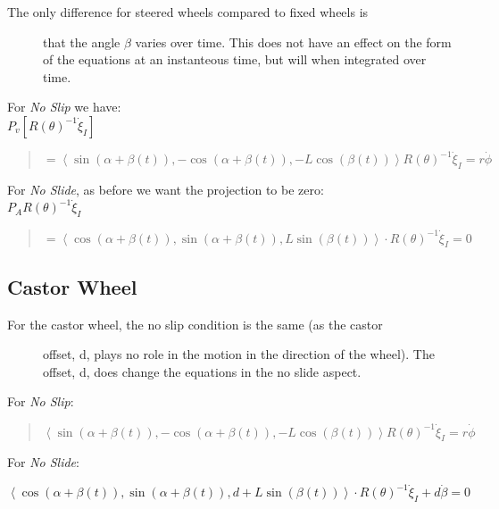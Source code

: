 \begin{description}
\item[The only difference for steered wheels compared to fixed wheels
is]
that the angle \(\beta\) varies over time. This does not have an effect
on the form of the equations at an instanteous time, but will when
integrated over time.
\end{description}

For \emph{No Slip} we have:\\
\(P_v [R(\theta)^{-1}\dot{\xi}_I]\)

\begin{quote}
\[=  \left\langle \sin(\alpha+\beta(t)) , -\cos(\alpha+\beta(t)), -L\cos(\beta(t)) \right\rangle
R(\theta)^{-1}\dot{\xi}_I = r\dot{\phi}\]
\end{quote}

For \emph{No Slide}, as before we want the projection to be zero:\\
\(P_A R(\theta)^{-1}\dot{\xi}_I\)

\begin{quote}
\[=  \left\langle \cos(\alpha+\beta(t)) , \sin(\alpha+\beta(t)), L\sin(\beta(t)) \right\rangle
\cdot R(\theta)^{-1}\dot{\xi}_I= 0\]
\end{quote}

\hypertarget{castor-wheel}{%
\subsection{Castor Wheel}\label{castor-wheel}}

\begin{description}
\item[For the castor wheel, the no slip condition is the same (as the
castor]
offset, d, plays no role in the motion in the direction of the wheel).
The offset, d, does change the equations in the no slide aspect.
\end{description}

For \emph{No Slip}:

\begin{quote}
\[\left\langle \sin(\alpha+\beta(t)) , -\cos(\alpha+\beta(t)), -L\cos(\beta(t)) \right\rangle
R(\theta)^{-1}\dot{\xi}_I = r\dot{\phi}\]
\end{quote}

For \emph{No Slide}:

\[\left\langle \cos(\alpha+\beta(t)) , \sin(\alpha+\beta(t)), d + L\sin(\beta(t)) \right\rangle
\cdot R(\theta)^{-1}\dot{\xi}_I + d\dot{\beta} = 0\]

